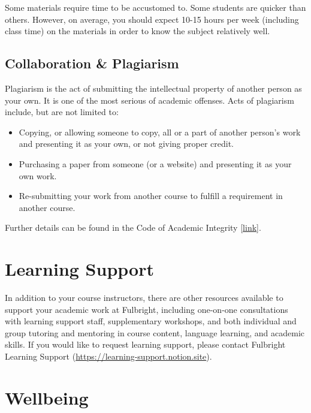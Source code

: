\documentclass[
  openany]{book}
\begin{document}
Some materials require time to be accustomed to. Some students are quicker than
others. However, on average, you should expect 10-15 hours per week (including class time)
on the materials in order to know the subject relatively well.

\hypertarget{collaboration-plagiarism}{%
\subsection*{Collaboration \& Plagiarism}\label{collaboration-plagiarism}}

Plagiarism is the act of submitting the intellectual property of another person as your own. It is one of the most serious of academic offenses. Acts of plagiarism include, but are not limited to:

\begin{itemize}
\item
  Copying, or allowing someone to copy, all or a part of another person's work and presenting it as your own, or not giving proper credit.
\item
  Purchasing a paper from someone (or a website) and presenting it as your own work.
\item
  Re-submitting your work from another course to fulfill a requirement in another course.
\end{itemize}

Further details can be found in the Code of Academic Integrity {[}\href{https://fulbright.edu.vn/articles/Code\%20of\%20Academic\%20Integrity/Code\%20of\%20Academic\%20Integrity_\%20Excom\%20Endorsed.pdf}{link}{]}.

\hypertarget{learning-support}{%
\section*{Learning Support}\label{learning-support}}

In addition to your course instructors, there are other resources available to support your
academic work at Fulbright, including one-on-one consultations with learning support staff,
supplementary workshops, and both individual and group tutoring and mentoring in course
content, language learning, and academic skills. If you would like to request learning support,
please contact Fulbright Learning Support (\url{https://learning-support.notion.site}).

\hypertarget{wellbeing}{%
\section*{Wellbeing}\label{wellbeing}}
\end{document}
